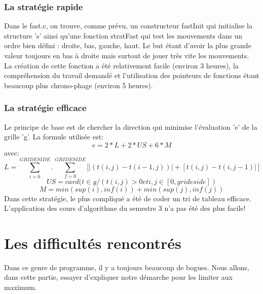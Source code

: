 \documentclass{report}
\begin{document}
\subsection{La stratégie rapide}
Dans le fast.c, on trouve, comme prévu, un constructeur fastInit qui initialise la structure 's' ainsi qu'une fonction stratFast qui test les mouvements dans un ordre bien défini : droite, bas, gauche, haut. Le but étant d'avoir la plus grande valeur toujours en bas à droite mais surtout de jouer très vite les mouvements.\\
La création de cette fonction a été relativement facile (environ 3 heures), la compréhension du travail demandé et l'utilisation des pointeurs de fonctions étant beaucoup plus chrono-phage (environ 5 heures).
\subsection{La stratégie efficace}
Le principe de base est de chercher la direction qui minimise l'évaluation 'e' de la grille 'g'. La formule utilisée est:
$$e=2*L+2*US+6*M$$ avec:
$$L=\sum_{i=0}^{GRIDESIDE} .^{ } \sum_{f=0}^{GRIDESIDE}[|(t(i,j)-t(i-1,j))|+[t(i,j)-t(i,j-1)|]$$
$$US=card(t \in g / (t(i,j)>0 et i,j \in [0,grideside]) $$
$$M=min(sup(i),inf(i)) + min(sup(j),inf(j))$$
Dans cette stratégie, le plus compliqué a été de coder un tri de tableau efficace. L'application des cours d'algorithme du semestre 3 n'a pas été des plus facile!

\chapter{Les difficultés rencontrés}
Dans ce genre de programme, il y a toujours beaucoup de bogues. Nous allons, dans cette partie, essayer d'expliquer notre démarche pour les limiter aux maximum.
\end{document}
